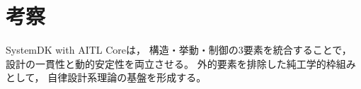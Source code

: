 \section{考察}
SystemDK with AITL Coreは，
構造・挙動・制御の3要素を統合することで，
設計の一貫性と動的安定性を両立させる。
外的要素を排除した純工学的枠組みとして，
自律設計系理論の基盤を形成する。
